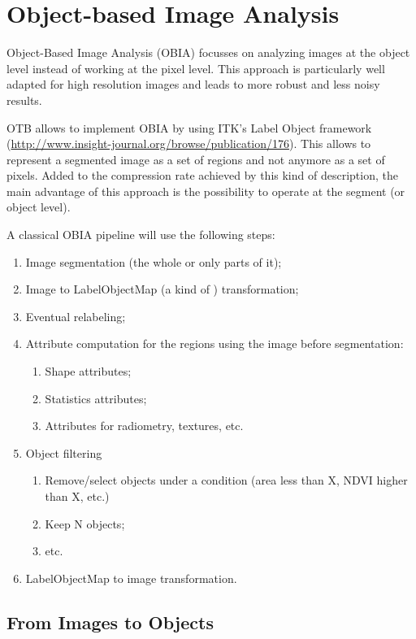 
\chapter{Object-based Image Analysis }\label{sec:OBIA}

Object-Based Image Analysis (OBIA) focusses on analyzing images at
the object level instead of working at the pixel level. This approach
is particularly well adapted for high resolution images and leads to
more robust and less noisy results.

OTB allows to implement OBIA by using ITK's Label Object framework
(\url{http://www.insight-journal.org/browse/publication/176}). This
allows to represent a segmented image as a set of regions and not
anymore as a set of pixels. Added to the compression rate achieved by
this kind of description, the main advantage of this approach is the
possibility to operate at the segment (or object level).

A classical OBIA pipeline will use the following steps:

\begin{enumerate}
\item Image segmentation (the whole or only parts of it);
\item Image to LabelObjectMap (a kind of ) transformation;
\item Eventual relabeling;
\item Attribute computation for the regions using the image before
  segmentation:
  \begin{enumerate}
         \item Shape attributes;
         \item Statistics attributes;
         \item Attributes for radiometry, textures, etc.
  \end{enumerate}

\item Object filtering
  \begin{enumerate}
         \item Remove/select objects under a condition (area less than
         X, NDVI higher than X, etc.)
	 \item Keep N objects;
	 \item etc.
  \end{enumerate}
\item LabelObjectMap to image transformation.
\end{enumerate}


\section{From Images to Objects}\label{sec:FromImagesToObjects}


